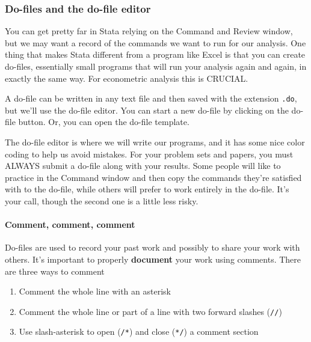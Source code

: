 \documentclass[11pt]{article}
\begin{document}
\hypertarget{do-files-and-the-do-file-editor}{%
\subsubsection*{Do-files and the do-file
editor}\label{do-files-and-the-do-file-editor}}

You can get pretty far in Stata relying on the Command and Review
window, but we may want a record of the commands we want to run for our
analysis. One thing that makes Stata different from a program like Excel
is that you can create do-files, essentially small programs that will
run your analysis again and again, in exactly the same way. For
econometric analysis this is CRUCIAL.

A do-file can be written in any text file and then saved with the
extension \texttt{.do}, but we'll use the do-file editor. You can start
a new do-file by clicking on the do-file button. Or, you can open the
do-file template.

The do-file editor is where we will write our programs, and it has some
nice color coding to help us avoid mistakes. For your problem sets and
papers, you must ALWAYS submit a do-file along with your results. Some
people will like to practice in the Command window and then copy the
commands they're satisfied with to the do-file, while others will prefer
to work entirely in the do-file. It's your call, though the second one
is a little less risky.

\hypertarget{comment-comment-comment}{%
\paragraph{Comment, comment, comment}\label{comment-comment-comment}}

Do-files are used to record your past work and possibly to share your
work with others. It's important to properly \textbf{document} your work
using comments. There are three ways to comment

\begin{enumerate}
\def\labelenumi{\arabic{enumi}.}
\item
  Comment the whole line with an asterisk
\item
  Comment the whole line or part of a line with two forward slashes
  (\texttt{//})
\item
  Use slash-asterisk to open (\texttt{/*}) and close (\texttt{*/}) a
  comment section
\end{enumerate}
\end{document}
